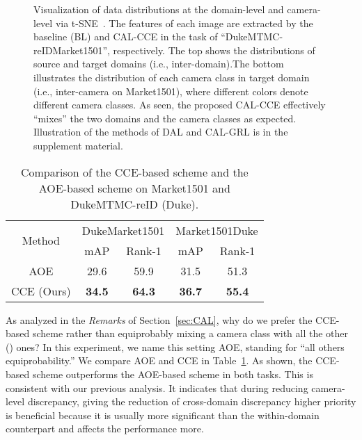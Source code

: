 \documentclass[10pt,twocolumn,letterpaper]{article}
\begin{document}
 
\begin{figure}\centering
{}
\caption{Visualization of data distributions at the domain-level and camera-level via t-SNE~\cite{maaten2008visualizing}. The features of each image are extracted by the baseline (BL) and CAL-CCE in the task of ``DukeMTMC-reIDMarket1501'', respectively. The top shows the distributions of source and target domains (i.e., inter-domain).The bottom illustrates the distribution of each camera class in target domain (i.e., inter-camera on Market1501), where different colors denote different camera classes. As seen, the proposed CAL-CCE effectively ``mixes'' the two domains and the camera classes as expected. Illustration of the methods of DAL and CAL-GRL is in the supplement material.}
\label{fig9}
\vspace*{-15pt}\end{figure}
 
 


 
 
\begin{table}[htbp]
 \centering
 \caption{Comparison of the CCE-based scheme and the AOE-based scheme on Market1501 and DukeMTMC-reID (Duke).}
   \begin{adjustbox}{width=0.4\textwidth}
   \begin{tabular}{|c|cc|cc|}
   \toprule
   \multirow{2}[1]{*}{Method} & \multicolumn{2}{c|}{DukeMarket1501} & \multicolumn{2}{c|}{Market1501Duke} \\
\cmidrule{2-5}         & mAP  & Rank-1 & mAP  & Rank-1 \\
   \midrule
   AOE   & 29.6 & 59.9 & 31.5 & 51.3 \\
   \midrule
   CCE (Ours) & \textcolor[rgb]{ 1, 0, 0}{\textbf{34.5}} & \textcolor[rgb]{ 1, 0, 0}{\textbf{64.3}} & \textcolor[rgb]{ 1, 0, 0}{\textbf{36.7}} & \textcolor[rgb]{ 1, 0, 0}{\textbf{55.4}} \\
   \bottomrule
   \end{tabular}\end{adjustbox}
 \label{tab10}\vspace*{-10pt}
\end{table}

 
As analyzed in the \textit{Remarks} of Section~\ref{sec:CAL}, why do we prefer the CCE-based scheme rather than equiprobably mixing a camera class with all the other () ones? In this experiment, we name this setting AOE, standing for ``all others equiprobability.'' We compare AOE and CCE in Table~\ref{tab10}. As shown, the CCE-based scheme outperforms the AOE-based scheme in both tasks. This is consistent with our previous analysis. It indicates that during reducing camera-level discrepancy, giving the reduction of cross-domain discrepancy higher priority is beneficial because it is usually more significant than the within-domain counterpart and affects the performance more.
 
\end{document}
